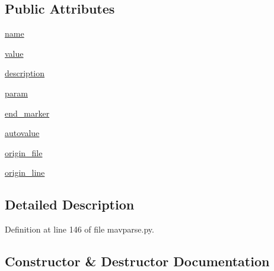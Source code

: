 \subsection*{Public Attributes}
\begin{DoxyCompactItemize}
\item 
\mbox{\hyperlink{classpymavlink_1_1generator_1_1mavparse_1_1MAVEnumEntry_a93164deaf93099ff9969b0744843fc05}{name}}
\item 
\mbox{\hyperlink{classpymavlink_1_1generator_1_1mavparse_1_1MAVEnumEntry_a9c52385757eaadbc51b454b359d7b49e}{value}}
\item 
\mbox{\hyperlink{classpymavlink_1_1generator_1_1mavparse_1_1MAVEnumEntry_a1bf829dd3493dd2c870f7c31edefc293}{description}}
\item 
\mbox{\hyperlink{classpymavlink_1_1generator_1_1mavparse_1_1MAVEnumEntry_a23cc404ee05ef1bfd75a21b44c13e1ab}{param}}
\item 
\mbox{\hyperlink{classpymavlink_1_1generator_1_1mavparse_1_1MAVEnumEntry_a396daeb4180aa6fa3947f02fbff103ee}{end\+\_\+marker}}
\item 
\mbox{\hyperlink{classpymavlink_1_1generator_1_1mavparse_1_1MAVEnumEntry_a6d1e6a9cc71f85db360f8b1a6316e70d}{autovalue}}
\item 
\mbox{\hyperlink{classpymavlink_1_1generator_1_1mavparse_1_1MAVEnumEntry_a492a7d08b0c02dc8566f12c4abd4fca5}{origin\+\_\+file}}
\item 
\mbox{\hyperlink{classpymavlink_1_1generator_1_1mavparse_1_1MAVEnumEntry_af0afe9aac5abeaf6a0c234b9a13060f0}{origin\+\_\+line}}
\end{DoxyCompactItemize}


\subsection{Detailed Description}


Definition at line 146 of file mavparse.\+py.



\subsection{Constructor \& Destructor Documentation}
\mbox{\label{classpymavlink_1_1generator_1_1mavparse_1_1MAVEnumEntry_af04252e1c346345682e28d8e0151b296}} 
